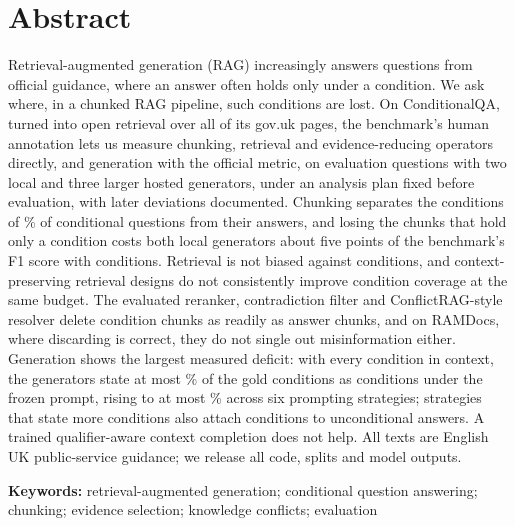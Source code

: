 \section*{Abstract}
Retrieval-augmented generation (RAG) increasingly answers questions from official guidance, where an answer often holds only under a condition. We ask where, in a chunked RAG pipeline, such conditions are lost. On ConditionalQA, turned into open retrieval over all \nPages{} of its gov.uk pages, the benchmark's human annotation lets us measure chunking, retrieval and evidence-reducing operators directly, and generation with the official metric, on \nEval{} evaluation questions with two local and three larger hosted generators, under an analysis plan fixed before evaluation, with later deviations documented. Chunking separates the conditions of \sepCond\% of conditional questions from their answers, and losing the chunks that hold only a condition costs both local generators about five points of the benchmark's F1 score with conditions. Retrieval is not biased against conditions, and context-preserving retrieval designs do not consistently improve condition coverage at the same budget. The evaluated reranker, contradiction filter and ConflictRAG-style resolver delete condition chunks as readily as answer chunks, and on RAMDocs, where discarding is correct, they do not single out misinformation either. Generation shows the largest measured deficit: with every condition in context, the generators state at most \prMaxRecallFrozen\% of the gold conditions as conditions under the frozen prompt, rising to at most \prMaxRecall\% across six prompting strategies; strategies that state more conditions also attach conditions to unconditional answers. A trained qualifier-aware context completion does not help. All texts are English UK public-service guidance; we release all code, splits and model outputs.

\par\vspace{5pt}\noindent
\textbf{\fontsize{12}{12}\selectfont Keywords:} retrieval-augmented generation; conditional question answering; chunking; evidence selection; knowledge conflicts; evaluation
